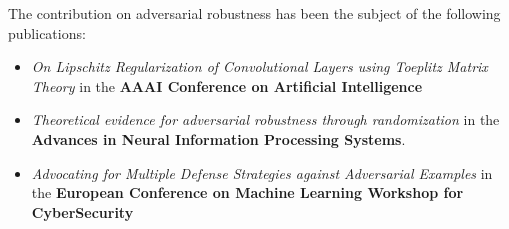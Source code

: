 \begin{mdframed}[
    topline=true,
    bottomline=true,
    rightline=true,
    linecolor=mydarkblue,
    linewidth=3pt,
    backgroundcolor=white,
    innerleftmargin=0.02\textwidth,
    innerrightmargin=0.02\textwidth,
    skipabove=0.5cm,
    skipbelow=0.5cm
  ]
  The contribution on adversarial robustness has been the subject of the following publications:
  \begin{itemize}[topsep=0pt,leftmargin=12pt]
    \setlength\itemsep{-0.3em}
    \item
      \emph{On Lipschitz Regularization of Convolutional Layers using Toeplitz Matrix Theory}
      in the \textbf{ AAAI Conference on Artificial Intelligence}
    \item
      \emph{Theoretical evidence for adversarial robustness through randomization} in the 
      \textbf{Advances in Neural Information Processing Systems}.
    \item
      \emph{Advocating for Multiple Defense Strategies against Adversarial Examples} in the
      \textbf{European Conference on Machine Learning Workshop for CyberSecurity}
  \end{itemize}
\end{mdframed}







